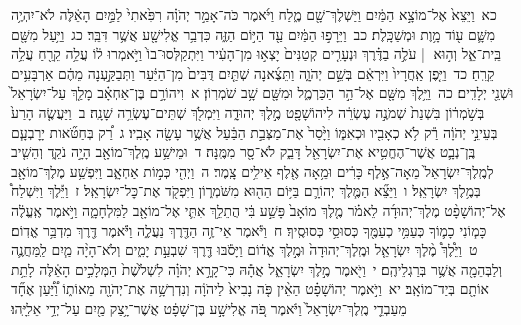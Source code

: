 \documentclass[18pt]{article}
\newcommand{\vart}[1]{\Bfootnote{#1}}	%
\begin{document}
 {\loc כא~}וַיֵּצֵא֙ אֶל־מוֹצָ֣א הַמַּ֔יִם וַיַּשְׁלֶךְ־שָׁ֖ם מֶ֑לַח וַיֹּ֜אמֶר כֹּה־אָמַ֣ר יְהֹוָ֗ה רִפִּ֙אתִי֙ לַמַּ֣יִם הָאֵ֔לֶּה לֹא־יִהְיֶ֥ה מִשָּׁ֛ם ע֖וֹד מָ֥וֶת וּמְשַׁכָּֽלֶת׃ \startlock
 {\loc כב~}וַיֵּרָפ֣וּ הַמַּ֔יִם עַ֖ד הַיּ֣וֹם הַזֶּ֑ה כִּדְבַ֥ר אֱלִישָׁ֖ע אֲשֶׁ֥ר דִּבֵּֽר׃ \startlock
 {\loc כג~}וַיַּ֥עַל מִשָּׁ֖ם בֵּֽית־אֵ֑ל וְה֣וּא  |  עֹלֶ֣ה בַדֶּ֗רֶךְ וּנְעָרִ֤ים קְטַנִּים֙ יָצְא֣וּ מִן־הָעִ֔יר וַיִּתְקַלְּסוּ־בוֹ֙ וַיֹּ֣אמְרוּ ל֔וֹ עֲלֵ֥ה קֵרֵ֖חַ עֲלֵ֥ה קֵרֵֽחַ׃ \startlock
 {\loc כד~}וַיִּ֤פֶן אַֽחֲרָיו֙ וַיִּרְאֵ֔ם  \edtext{וַֽיְקַלְלֵ֖ם}{\vart{א=וַֽיְקַלֲלֵ֖ם | }}  בְּשֵׁ֣ם יְהֹוָ֑ה וַתֵּצֶ֜אנָה שְׁתַּ֤יִם דֻּבִּים֙ מִן־הַיַּ֔עַר וַתְּבַקַּ֣עְנָה מֵהֶ֔ם אַרְבָּעִ֥ים וּשְׁנֵ֖י יְלָדִֽים׃ \startlock
 {\loc כה~}וַיֵּ֥לֶךְ מִשָּׁ֖ם אֶל־הַ֣ר הַכַּרְמֶ֑ל וּמִשָּׁ֖ם שָׁ֥ב שֹׁמְרֽוֹן׃ 
\startlock
 {\loc א~}וִיהוֹרָ֣ם בֶּן־אַחְאָ֗ב מָלַ֤ךְ עַל־יִשְׂרָאֵל֙ בְּשֹׁ֣מְר֔וֹן בִּשְׁנַת֙ שְׁמֹנֶ֣ה עֶשְׂרֵ֔ה לִיהוֹשָׁפָ֖ט מֶ֣לֶךְ יְהוּדָ֑ה וַיִּמְלֹ֖ךְ שְׁתֵּים־עֶשְׂרֵ֥ה שָׁנָֽה׃ \startlock
 {\loc ב~}וַיַּעֲשֶׂ֤ה הָרַע֙ בְּעֵינֵ֣י יְהֹוָ֔ה רַ֕ק לֹ֥א כְאָבִ֖יו וּכְאִמּ֑וֹ וַיָּ֙סַר֙ אֶת־מַצְּבַ֣ת הַבַּ֔עַל אֲשֶׁ֥ר עָשָׂ֖ה אָבִֽיו׃ \startlock
 {\loc ג~}רַ֠ק בְּחַטֹּ֞אות יָרׇבְעָ֧ם בֶּֽן־נְבָ֛ט אֲשֶׁר־הֶחֱטִ֥יא אֶת־יִשְׂרָאֵ֖ל דָּבֵ֑ק לֹא־סָ֖ר מִמֶּֽנָּה׃ \startlock
 {\loc ד~}וּמֵישַׁ֥ע מֶֽלֶךְ־מוֹאָ֖ב הָיָ֣ה נֹקֵ֑ד וְהֵשִׁ֤יב לְמֶֽלֶךְ־יִשְׂרָאֵל֙ מֵאָה־אֶ֣לֶף כָּרִ֔ים וּמֵ֥אָה אֶ֖לֶף אֵילִ֥ים צָֽמֶר׃ \startlock
 {\loc ה~}וַיְהִ֖י כְּמ֣וֹת אַחְאָ֑ב וַיִּפְשַׁ֥ע מֶלֶךְ־מוֹאָ֖ב בְּמֶ֥לֶךְ יִשְׂרָאֵֽל׃ \startlock
 {\loc ו~}וַיֵּצֵ֞א הַמֶּ֧לֶךְ יְהוֹרָ֛ם בַּיּ֥וֹם הַה֖וּא מִשֹּׁמְר֑וֹן וַיִּפְקֹ֖ד אֶת־כׇּל־יִשְׂרָאֵֽל׃ \startlock
 {\loc ז~}וַיֵּ֡לֶךְ וַיִּשְׁלַח֩ אֶל־יְהוֹשָׁפָ֨ט מֶלֶךְ־יְהוּדָ֜ה לֵאמֹ֗ר מֶ֤לֶךְ מוֹאָב֙ פָּשַׁ֣ע בִּ֔י הֲתֵלֵ֥ךְ אִתִּ֛י אֶל־מוֹאָ֖ב לַמִּלְחָמָ֑ה וַיֹּ֣אמֶר אֶֽעֱלֶ֔ה כָּמ֧וֹנִי כָמ֛וֹךָ כְּעַמִּ֥י כְעַמֶּ֖ךָ כְּסוּסַ֥י כְּסוּסֶֽיךָ׃ \startlock
 {\loc ח~}וַיֹּ֕אמֶר אֵי־זֶ֥ה הַדֶּ֖רֶךְ נַעֲלֶ֑ה וַיֹּ֕אמֶר דֶּ֖רֶךְ מִדְבַּ֥ר אֱדֽוֹם׃ \startlock
 {\loc ט~}וַיֵּ֩לֶךְ֩ מֶ֨לֶךְ יִשְׂרָאֵ֤ל וּמֶֽלֶךְ־יְהוּדָה֙ וּמֶ֣לֶךְ אֱד֔וֹם וַיָּסֹ֕בּוּ דֶּ֖רֶךְ שִׁבְעַ֣ת יָמִ֑ים וְלֹא־הָיָ֨ה מַ֧יִם לַֽמַּחֲנֶ֛ה וְלַבְּהֵמָ֖ה אֲשֶׁ֥ר בְּרַגְלֵיהֶֽם׃ \startlock
 {\loc י~}וַיֹּ֖אמֶר מֶ֣לֶךְ יִשְׂרָאֵ֑ל אֲהָ֕הּ כִּי־קָרָ֣א יְהֹוָ֗ה לִשְׁלֹ֙שֶׁת֙ הַמְּלָכִ֣ים הָאֵ֔לֶּה לָתֵ֥ת אוֹתָ֖ם בְּיַד־מוֹאָֽב׃ \startlock
 {\loc יא~}וַיֹּ֣אמֶר יְהוֹשָׁפָ֗ט הַאֵ֨ין פֹּ֤ה נָבִיא֙ לַיהֹוָ֔ה וְנִדְרְשָׁ֥ה אֶת־יְהֹוָ֖ה מֵאוֹת֑וֹ וַ֠יַּ֠עַן אֶחָ֞ד מֵעַבְדֵ֤י מֶֽלֶךְ־יִשְׂרָאֵל֙ וַיֹּ֔אמֶר פֹּ֚ה אֱלִישָׁ֣ע בֶּן־שָׁפָ֔ט אֲשֶׁר־יָ֥צַק מַ֖יִם עַל־יְדֵ֥י אֵלִיָּֽהוּ׃ \startlock
\end{document}
